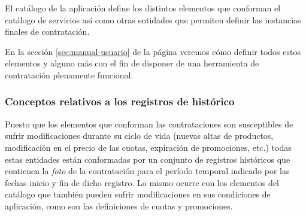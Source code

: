 El catálogo de la aplicación define los distintos elementos que conforman el catálogo de servicios así como otras entidades que permiten definir las instancias finales de contratación.



En la sección \ref{sec:manual-usuario} de la página \pageref{sec:manual-usuario} veremos cómo definir todos estos elementos y alguno más con el fin de disponer de una herramienta de contratación plenamente funcional.



\subsubsection{Conceptos relativos a los registros de histórico}
\label{sub:histórico-conceptos}

Puesto que los elementos que conforman las contrataciones son susceptibles de sufrir modificaciones durante su ciclo de vida (nuevas altas de productos, modificación en el precio de las cuotas, expiración de promociones, etc.) todas estas entidades están conformadas por un conjunto de registros históricos que contienen la \textit{foto} de la contratación para el período temporal indicado por las fechas inicio y fin de dicho registro. Lo mismo ocurre con los elementos del catálogo que también pueden sufrir modificaciones en sus condiciones de aplicación, como son las definiciones de cuotas y promociones.

